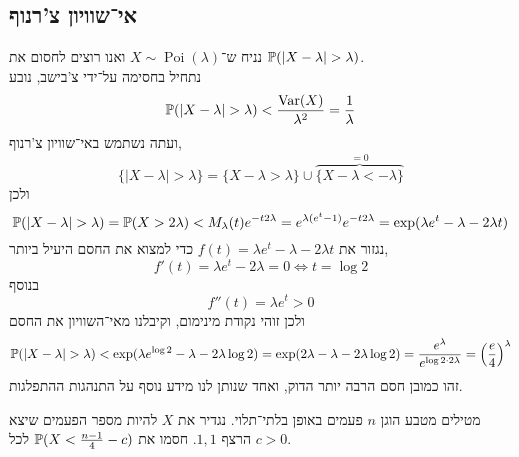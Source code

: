 \subsection{אי־שוויון צ'רנוף}
\begin{example}
	נניח ש־$X \sim \operatorname{Poi}(\lambda)$ ואנו רוצים לחסום את $\mathbb{P}(|X - \lambda| > \lambda)$. \\
	נתחיל בחסימה על־ידי צ'בישב, נובע
	\[
		\mathbb{P}(|X - \lambda| > \lambda)
		< \frac{\operatorname{Var}(X)}{\lambda^2}
		= \frac{1}{\lambda}
	\]
	ועתה נשתמש באי־שוויון צ'רנוף,
	\[
		\{ |X - \lambda| > \lambda \}
		= \{ X - \lambda > \lambda \} \cup \overbrace{\{X - \lambda < - \lambda \}}^{= 0}
	\]
	ולכן
	\[
		\mathbb{P}(|X - \lambda| > \lambda)
		= \mathbb{P}(X > 2 \lambda)
		< M_\lambda(t) e^{-t 2\lambda}
		= e^{\lambda(e^t - 1)} e^{-t2\lambda}
		= \exp(\lambda e^t - \lambda - 2 \lambda t)
	\]
	נגזור את $f(t) = \lambda e^t - \lambda - 2 \lambda t$ כדי למצוא את החסם היעיל ביותר,
	\[
		f'(t)
		= \lambda e^t - 2 \lambda
		= 0
		\iff
		t = \log 2
	\]
	בנוסף
	\[
		f''(t) = \lambda e^t > 0
	\]
	ולכן זוהי נקודת מינימום, וקיבלנו מאי־השוויון את החסם
	\[
		\mathbb{P}(|X - \lambda| > \lambda)
		< \exp(\lambda e^{\log 2} - \lambda - 2 \lambda \log 2)
		= \exp (2\lambda - \lambda - 2 \lambda \log 2)
		= \frac{e^\lambda}{e^{\log 2 \cdot 2 \lambda}}
		= {\left(\frac{e}{4}\right)}^\lambda
	\]
	זהו כמובן חסם הרבה יותר הדוק, ואחד שנותן לנו מידע נוסף על התנהגות ההתפלגות.
\end{example}
\begin{exercise}
	מטילים מטבע הוגן $n$ פעמים באופן בלתי־תלוי.
	נגדיר את $X$ להיות מספר הפעמים שיצא הרצף $1, 1$.
	חסמו את $\mathbb{P}(X < \frac{n - 1}{4} - c)$ לכל $c > 0$.
\end{exercise}
